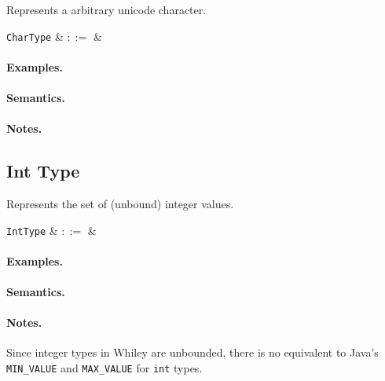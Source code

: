 Represents a arbitrary unicode character.

\begin{syntax}
  \verb+CharType+ & $::=$ &  \\
\end{syntax}

\paragraph{Examples.}

\paragraph{Semantics.}

\paragraph{Notes.} 


\subsection{Int Type}

Represents the set of (unbound) integer values. 

\begin{syntax}
  \verb+IntType+ & $::=$ &  \\
\end{syntax}

\paragraph{Examples.}

\paragraph{Semantics.}

\paragraph{Notes.}  Since integer types in Whiley are unbounded, there
is no equivalent to Java's \lstinline{MIN_VALUE} and \lstinline{MAX_VALUE} for \lstinline{int} types.



